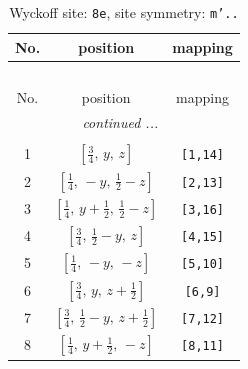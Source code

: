 \documentclass[fleqn,8pt]{jsarticle}
\begin{document}
\begin{longtable}{ccc}
\caption{Wyckoff site: {\tt 8e}, site symmetry: {\tt m'..}}
 \\
 \hline \hline
No. & position & mapping \\ \hline \endfirsthead

\multicolumn{2}{l}{\tablename\ \thetable{}} \\
 \hline \hline
No. & position & mapping \\ \hline \endhead

 \hline \hline
\multicolumn{2}{r}{\footnotesize\it continued ...} \\ \endfoot

 \hline \hline
\multicolumn{2}{r}{} \\ \endlastfoot

1 & $\left[ \frac{3}{4},\, y,\, z \right]$ & {\tt [1,14]} \\ \hline
2 & $\left[ \frac{1}{4},\, - y,\, \frac{1}{2} - z \right]$ & {\tt [2,13]} \\ \hline
3 & $\left[ \frac{1}{4},\, y + \frac{1}{2},\, \frac{1}{2} - z \right]$ & {\tt [3,16]} \\ \hline
4 & $\left[ \frac{3}{4},\, \frac{1}{2} - y,\, z \right]$ & {\tt [4,15]} \\ \hline
5 & $\left[ \frac{1}{4},\, - y,\, - z \right]$ & {\tt [5,10]} \\ \hline
6 & $\left[ \frac{3}{4},\, y,\, z + \frac{1}{2} \right]$ & {\tt [6,9]} \\ \hline
7 & $\left[ \frac{3}{4},\, \frac{1}{2} - y,\, z + \frac{1}{2} \right]$ & {\tt [7,12]} \\ \hline
8 & $\left[ \frac{1}{4},\, y + \frac{1}{2},\, - z \right]$ & {\tt [8,11]} \\
\end{longtable}
\renewcommand{\arraystretch}{1.2}
\end{document}

